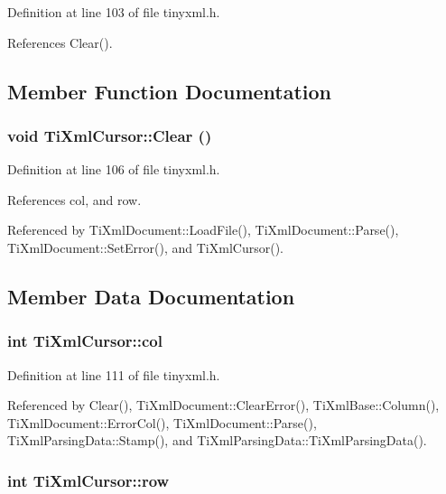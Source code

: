 Definition at line 103 of file tinyxml.h.

References Clear().

\subsection{Member Function Documentation}
\hypertarget{struct_ti_xml_cursor_a1e6fa622b59dafb71b6efe595105dcdd}{
\subsubsection[{Clear}]{\setlength{\rightskip}{0pt plus 5cm}void TiXmlCursor::Clear ()}}
\label{struct_ti_xml_cursor_a1e6fa622b59dafb71b6efe595105dcdd}


Definition at line 106 of file tinyxml.h.

References col, and row.

Referenced by TiXmlDocument::LoadFile(), TiXmlDocument::Parse(), TiXmlDocument::SetError(), and TiXmlCursor().

\subsection{Member Data Documentation}
\hypertarget{struct_ti_xml_cursor_a5694d7ed2c4d20109d350c14c417969d}{
\subsubsection[{col}]{\setlength{\rightskip}{0pt plus 5cm}int {\bf TiXmlCursor::col}}}
\label{struct_ti_xml_cursor_a5694d7ed2c4d20109d350c14c417969d}


Definition at line 111 of file tinyxml.h.

Referenced by Clear(), TiXmlDocument::ClearError(), TiXmlBase::Column(), TiXmlDocument::ErrorCol(), TiXmlDocument::Parse(), TiXmlParsingData::Stamp(), and TiXmlParsingData::TiXmlParsingData().\hypertarget{struct_ti_xml_cursor_a5b54dd949820c2db061e2be41f3effb3}{
\subsubsection[{row}]{\setlength{\rightskip}{0pt plus 5cm}int {\bf TiXmlCursor::row}}}
\label{struct_ti_xml_cursor_a5b54dd949820c2db061e2be41f3effb3}


